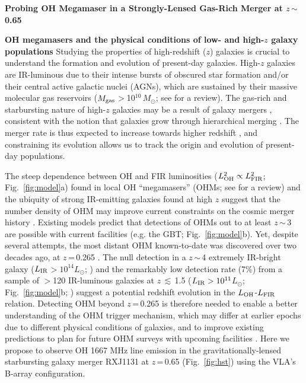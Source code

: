 \documentclass[letterpaper,11pt]{article}
\newcommand{\Lsun}{\mbox{$L_{\odot}$}\xspace}
\newcommand{\Msun}{\mbox{$M_{\odot}$}\xspace}
\newcommand{\LIR}{\mbox{$L_{\rm IR}$}\xspace}
\newcommand{\LFIR}{\mbox{$L_{\rm FIR}$}\xspace}
\newcommand{\LOH}{$L_{\rm OH}$\xspace}
\newcommand{\Fig}[1]{Fig.~\ref{fig:#1}}
\newcommand{\eq}{\,=\,}
\newcommand{\ssim}{\,$\sim$\,}
\newcommand{\galpop}{galaxy populations\xspace}
\begin{document}
\pagestyle{plain}



\begin{center}
{\large{\bf{Probing OH Megamaser in a Strongly-Lensed Gas-Rich Merger at $z$\ssim0.65}}}
\end{center}
\vspace{-.8em}
\textbf{OH megamasers and the physical conditions of low- and high-$z$ \galpop}
Studying the properties of high-redshift ($z$) galaxies is crucial to understand the formation and evolution of present-day galaxies.
High-$z$ galaxies are IR-luminous due to their intense bursts
of obscured star formation and/or their central active galactic nuclei (AGNs),
which are sustained by their massive molecular gas reservoirs ($M_{\rm gas}$$>$10$^{10}$\,\Msun; see \citealt{CW13} for a review).
The gas-rich and starbursting nature of high-$z$ galaxies may be a result of galaxy mergers
\citep{Riechers11a, Hayward12a, Riechers13b},
consistent with the notion that galaxies grow through hierarchical merging \citep{White91a}.
The merger rate is thus expected to increase towards higher redshift \citep[e.g.,][]{LeFloch05a, Magnelli09a}, and constraining
its evolution allows us to track the origin and evolution of present-day populations. %

\noindent The steep dependence between OH and FIR luminosities ($L_{\rm OH}^2\propto L_{\rm FIR}^2$; \Fig{model}a)
found in local OH ``megamasers'' (OHMs;  see \citealt[]{Lo05a} for a review) and
the ubiquity of strong IR-emitting galaxies found at high $z$ suggest that
the number density of OHM may improve current constraints on
the cosmic merger history \citep[hereafter DG02]{Darling02b_LF}.
Existing models predict that detections of
OHMs out to at least $z$\ssim3 are possible with current facilities (e.g. the GBT; \Fig{model}b).
Yet, despite several attempts,
the most distant OHM known-to-date was discovered over two decades ago, at $z$\eq0.265 \citep{Baan92a}.
The null detection in a $z$\ssim4 extremely IR-bright galaxy (\LIR$>10^{14}$\Lsun; \citealt{Ivison06a}) and
the remarkably low detection rate (7\%) from a sample of $>$120 IR-luminous galaxies
at $z$\,$\lesssim$\,1.5 ($L_{\rm IR}>10^{11}$\Lsun; \Fig{model}b; \citealt{Willett12a})
suggest a potential redshift evolution in the \LOH-\LFIR relation.
Detecting OHM beyond $z$\eq0.265 is therefore needed to enable a better understanding of the
OHM trigger mechanism, which may differ at earlier epochs due to different physical conditions of galaxies,
and to improve existing predictions to plan for future OHM surveys with upcoming facilities
\citep[e.g., FAST, APERTIF/WSRT, ASKAP;][]{Zhang14b}.
Here we propose to observe OH 1667 MHz line emission in the
gravitationally-lensed starbursting galaxy merger
RXJ1131 at $z$\eq0.65 (\Fig{hst}) using the VLA's B-array configuration.
\end{document}
